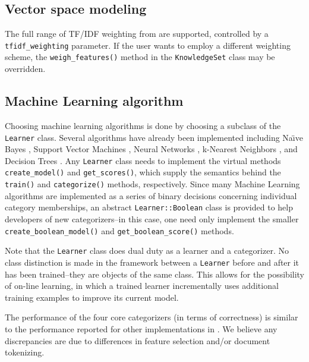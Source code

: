 \documentclass[a4paper,twocolumn]{article}
\begin{document}
\subsection*{Vector space modeling}
The full range of TF/IDF weighting from \cite{salton:88} are
supported, controlled by a \texttt{tfidf\_weighting} parameter.  If
the user wants to employ a different weighting scheme, the
\texttt{weigh\_features()} method in the \texttt{KnowledgeSet} class
may be overridden.

\subsection*{Machine Learning algorithm}
Choosing machine learning algorithms is done
by choosing a subclass of the \texttt{Learner} class.  Several
algorithms have already been implemented including Na\"\i ve Bayes
\cite{lewis:98}, Support Vector Machines \cite{scholkopf:99}
\cite{cortes:95}, Neural Networks \cite{calvo:01} \cite{yang:99},
k-Nearest Neighbors \cite{yang:99}, and Decision Trees
\cite{quinlan:89}.  Any \texttt{Learner} class needs to implement the
virtual methods \texttt{create\_model()} and \texttt{get\_scores()},
which supply the semantics behind the \texttt{train()} and
\texttt{categorize()} methods, respectively.  Since many Machine
Learning algorithms are implemented as a series of binary decisions
concerning individual category memberships, an abstract
\texttt{Learner::Boolean} class is provided to help developers of new
categorizers--in this case, one need only implement the smaller
\texttt{create\_boolean\_model()} and \texttt{get\_boolean\_score()}
methods.

Note that the \texttt{Learner} class does dual duty as a learner and a
categorizer.  No class distinction is made in the framework between a
\texttt{Learner} before and after it has been trained--they are
objects of the same class.  This allows for the possibility of on-line
learning, in which a trained learner incrementally uses additional
training examples to improve its current model.

The performance of the four core categorizers (in terms of
correctness) is similar to the performance reported for other
implementations in \cite{yang:99}.  We believe any discrepancies are
due to differences in feature selection and/or document tokenizing.
\end{document}
